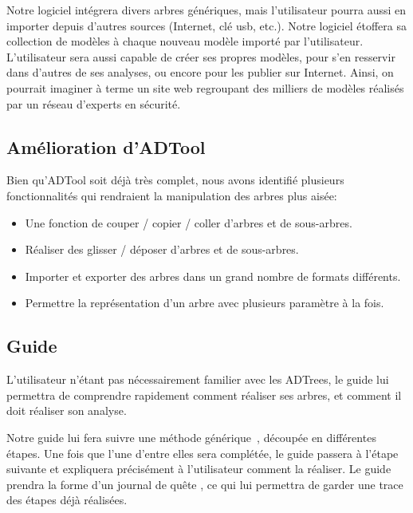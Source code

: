         Notre logiciel intégrera divers arbres génériques, mais l'utilisateur pourra aussi en importer depuis d'autres sources (Internet, clé usb, etc.). Notre logiciel étoffera sa collection de modèles à chaque nouveau modèle importé par l'utilisateur.
        L'utilisateur sera aussi capable de créer ses propres modèles, pour s'en resservir dans d'autres de ses analyses, ou encore pour les publier sur Internet. Ainsi, on pourrait imaginer à terme un site web regroupant des milliers de modèles réalisés par un réseau d'experts en sécurité.

    \subsection{Amélioration d'ADTool}
        \label{sec:adtoolpp}

        Bien qu'ADTool soit déjà très complet, nous avons identifié plusieurs fonctionnalités qui rendraient la manipulation des arbres plus aisée:
        \begin{itemize}
            \item Une fonction de couper / copier / coller d'arbres et de sous-arbres.
            \item Réaliser des glisser / déposer d'arbres et de sous-arbres.
            \item Importer et exporter des arbres dans un grand nombre de formats différents.
            \item Permettre la représentation d'un arbre avec plusieurs paramètre à la fois.
        \end{itemize}

    \subsection{Guide}
        \label{sec:guide}

        L'utilisateur n'étant pas nécessairement familier avec les ADTrees, le guide lui permettra de comprendre rapidement comment réaliser ses arbres, et comment il doit réaliser son analyse.

        Notre guide lui fera suivre une méthode générique~\cite{methode_analyse}, découpée en différentes étapes. Une fois que l'une d'entre elles sera complétée, le guide passera à l'étape suivante et expliquera précisément à l'utilisateur comment la réaliser.
        Le guide prendra la forme d'un \og journal de quête \fg, ce qui lui permettra de garder une trace des étapes déjà réalisées.

